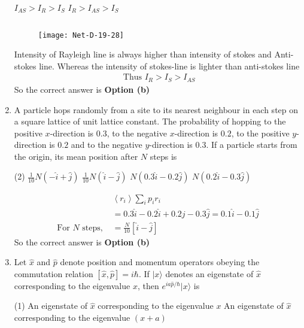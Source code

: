 \begin{enumerate}
\begin{tasks}
	\task[\textbf{c.}]$I_{A S}>I_{R}>I_{S}$
	\task[\textbf{d.}]$I_{R}>I_{A S}>I_{S}$ 
\end{tasks}
\begin{answer}$\left. \right. $
	\begin{figure}[H]
		\centering
		\texttt{[image: Net-D-19-28]}
	\end{figure}
	 Intensity of Rayleigh line is always higher than intensity of stokes and Anti-stokes line.
	Whereas the intensity of stokes-line is lighter than anti-stokes line
	\begin{align*}
	\text { Thus } I_{R}>I_{S}>I_{A S}
	\end{align*}
	So the correct answer is \textbf{Option (b)}
\end{answer}
\item A particle hops randomly from a site to its nearest neighbour in each step on a square lattice of unit lattice constant. The probability of hopping to the positive $x$-direction is $0.3$, to the negative $x$-direction is $0.2$, to the positive $y$-direction is $0.2$ and to the negative $y$-direction is $0.3$. If a particle starts from the origin, its mean position after $N$ steps is
 \begin{tasks}(2)
	\task[\textbf{a.}] $\frac{1}{10} N(-\hat{i}+\hat{j})$
	\task[\textbf{b.}]$\frac{1}{10} N(\hat{i}-\hat{j})$
	\task[\textbf{c.}]$N(0.3 \hat{i}-0.2 \hat{j})$
	\task[\textbf{d.}]  $N(0.2 \hat{i}-0.3 \hat{j})$
\end{tasks}
\begin{answer}
	\begin{align*}
	&\left\langle r_{i}\right\rangle \sum_{i} p_{i} r_{i}\\
	&=0.3 \hat{i}-0.2 \hat{i}+0.2 j-0.3 \hat{j}=0.1 \hat{i}-0.1 \hat{j}\\
	\text{For $N$ steps, }&=\frac{N}{10}[\hat{i}-\hat{j}]
	\end{align*}
		So the correct answer is \textbf{Option (b)}
\end{answer}
\item Let $\hat{x}$ and $\hat{p}$ denote position and momentum operators obeying the commutation relation $[\hat{x}, \hat{p}]=i \hbar$. If $|x\rangle$ denotes an eigenstate of $\hat{x}$ corresponding to the eigenvalue $x$, then $e^{i a \hat{p} / \hbar}|x\rangle$ is	
 \begin{tasks}(1)
	\task[\textbf{a.}]An eigenstate of $\hat{x}$ corresponding to the eigenvalue $x$
	\task[\textbf{b.}] An eigenstate of $\hat{x}$ corresponding to the eigenvalue $(x+a)$

\end{tasks}
\end{enumerate}
